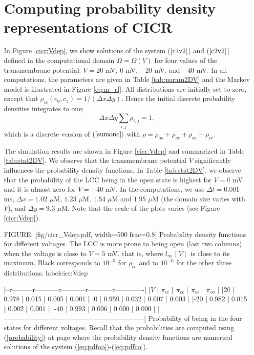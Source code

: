 \section{Computing probability density representations of CICR}

 In Figure \ref{cicr:Vdep}, we show solutions of the system ($\ref{c1v2}$) and ($\ref{c2v2}$) defined in the computational domain
 $\Omega=\Omega(V)$ for four values of the transmembrane potential: $V = 20$ mV, $0$ mV, $-20$ mV, and $-40$ mV. In all computations, the parameters are given in Table \ref{tab:param2DV} and the Markov model is illustrated in Figure \ref{eq:m_rl}.
All distributions are initially set to zero, except that $\rho_{cc}(c_0,c_1)= 1/(\Delta x \Delta y)$. Hence the initial discrete probability densities integrates to one;
\begin{equation}
\Delta x \Delta y \sum_{i,j}  \rho_{i,j}=1,  %
\end{equation}
which is a discrete version of $(\ref{sumone})$ with $\rho=\rho_{oo}+\rho_{oc}+\rho_{co}+\rho_{cc}$.

The simulation results are shown in Figure \ref{cicr:Vdep}  and summarized in Table \ref{tab:stat2DV}. We observe that the transmembrane potential $V$ significantly influences the probability density functions. In Table \ref{tab:stat2DV}, we observe that the probability of the LCC being in the open state is highest for $V=0$ mV and it is almost zero for $V=-40$ mV. In the computations, we use $\Delta t=0.001$ ms, $\Delta x=1.02$ $\mu$M, $1.23$ $\mu$M, $1.54$ $\mu$M and $1.95$ $\mu$M (the domain size varies with $V$), and $\Delta y=9.3$ $\mu$M. Note that the scale of the plots varies (see Figure \ref{cicr:Vdep}).


FIGURE: [fig/cicr_Vdep.pdf, width=500 frac=0.8] Probability density functions for different voltages. The LCC is more prone to being open (last two columns) when the voltage is close to $V=5$ mV, that is, where $l_{\infty}(V)$ is close to its maximum. Black corresponds to $10^{-3}$ for $\rho_{cc}$ and to $10^{-6}$ for the other three distributions. label{cicr:Vdep}



|--r---------r-----------r-----------r-----------r-------------|
|$V$ | $\pi_{cc}$ | $\pi_{co}$ | $\pi_{oc}$ | $\pi_{oo}$       |
|20  |      0.978 | 0.015      | 0.005      | 0.001            |
|0   |      0.959 | 0.032      | 0.007      | 0.003            |
|-20 |      0.982 | 0.015      | 0.002      | 0.001            |
|-40 |      0.993 | 0.006      | 0.000      | 0.000            |
|--------------------------------------------------------------|
Probability of being in the four states for different voltages. Recall that the probabilities are computed
using  (\ref{probability}) at page \pageref{probability} where the probability density functions are numerical solutions
of the system (\ref{eq:pdfoo})-(\ref{eq:pdfco}).
\label{tab:stat2DV}





